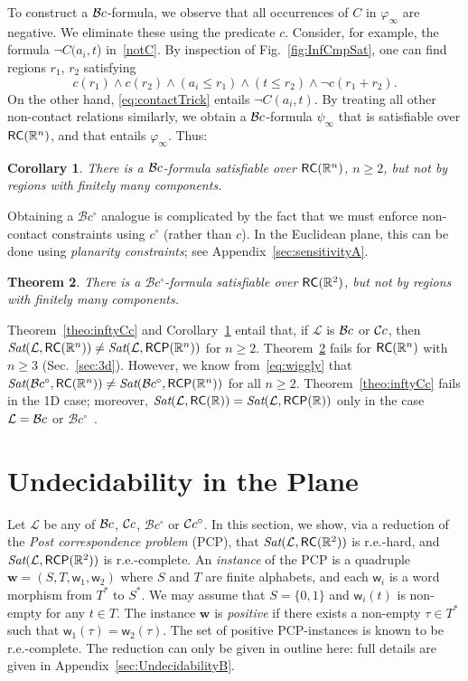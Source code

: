 \documentclass{article}
\newtheorem{theorem}{Theorem}
\newtheorem{corollary}[theorem]{Corollary}
\newcommand{\ic}{c^\circ}
\newcommand{\Sat}{\textit{Sat}}
\newcommand{\cBci}{\ensuremath{\mathcal{B}c^\circ}}
\newcommand{\R}{\mathbb{R}}
\newcommand{\RC}{{\sf RC}}
\newcommand{\RCP}{{\sf RCP}}
\newcommand{\fw}{\mathsf{w}}
\newcommand{\fW}{\mathbf{w}}
\newcommand{\cL}{\mathcal{L}}
\newcommand{\set}[1]{\{#1\}}
\renewcommand{\phi}{\varphi}
\begin{document}
To construct a $\mathcal{B}c$-formula, we observe
that all occurrences of $C$ in $\phi_\infty$ are negative. We eliminate
these using the predicate $c$. Consider, for example, the formula
$\neg C(a_i, t$) in~\eqref{notC}.
By inspection of Fig.~\ref{fig:InfCmpSat},
one can find regions $r_1$, $r_2$ satisfying
\begin{equation}
\label{eq:contactTrick}
c(r_1) \wedge c(r_2) \wedge (a_i \leq r_1) \wedge (t \leq r_2)
\wedge \neg c(r_1+r_2).
\end{equation}
On the other hand, \eqref{eq:contactTrick} entails $\neg C(a_i,t)$. By
treating all other non-contact relations similarly, we obtain a
$\mathcal{B}c$-formula $\psi_\infty$ that is satisfiable over $\RC(\R^n)$, and
that entails $\phi_\infty$. Thus:
\begin{corollary}\label{cor:inftyBc}
There is a $\mathcal{B}c$-formula satisfiable over $\RC(\R^n)$, $n \geq 2$,
but not by regions with finitely many components.
\end{corollary}

Obtaining a $\cBci$ analogue is complicated by the fact that we must
enforce non-contact constraints using $\ic$ (rather than $c$). In the
Euclidean plane, this can be done using \emph{planarity constraints};
see Appendix~\ref{sec:sensitivityA}.
\begin{theorem}\label{theo:inftyBci}
There is a $\cBci$-formula satisfiable over $\RC(\R^2)$, but not by
regions with finitely many components.
\end{theorem}

Theorem~\ref{theo:inftyCc} and Corollary~\ref{cor:inftyBc} entail that, if
$\cL$ is $\mathcal{B}c$ or $\mathcal{C}c$, then $\Sat(\cL,\RC(\R^n)) \neq
\Sat(\cL,\RCP(\R^n))$ for $n \geq 2$.  Theorem~\ref{theo:inftyBci}
fails for $\RC(\R^n)$ with $n\geq 3$ (Sec.~\ref{sec:3d}).  However, we
know from~\eqref{eq:wiggly} that $\Sat(\cBci,\RC(\R^n)) \neq
\Sat(\cBci,\RCP(\R^n))$ for all $n \geq 2$. Theorem~\ref{theo:inftyCc}
fails in the 1D case; moreover, $\Sat(\cL,\RC(\R))=\Sat(\cL,\RCP(\R))$
only in the case $\cL = \cBc$ or $\cBci$~\cite{ijcai:kphz10}.





\section{Undecidability in the Plane}\label{sec:undecidability}

Let $\cL$ be any of $\mathcal{B}c$, $\mathcal{C}c$, $\cBci$ or $\mathcal{C}c^\circ$. In this
section, we show, via a reduction of the {\em Post correspondence
  problem} (PCP), that $\Sat(\cL,\RC(\R^2))$ is r.e.-hard, and
$\Sat(\cL,\RCP(\R^2))$ is r.e.-complete. An {\em instance} of the PCP
is a quadruple $\fW = (S, T, \fw_1, \fw_2)$ where $S$ and $T$ are
finite alphabets, and each $\fw_i$ is a word morphism from $T^*$ to
$S^*$. We may assume that $S = \set{0,1}$ and $\fw_i(t)$ is non-empty
for any $t \in T$. The instance $\fW$ is {\em positive} if there
exists a non-empty $\tau \in T^*$ such that $\fw_1(\tau) = \fw_2(\tau)$. The set
of positive PCP-instances is known to be r.e.-complete. The reduction
can only be given in outline here: full details are given in 
Appendix~\ref{sec:UndecidabilityB}.
\end{document}
